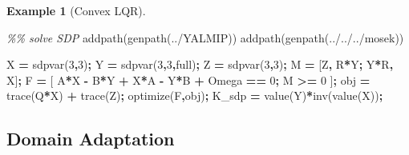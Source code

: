 \documentclass[
]{book}
\newenvironment{Shaded}{\begin{snugshade}}{\end{snugshade}}
\newcommand{\CommentTok}[1]{\textcolor[rgb]{0.56,0.35,0.01}{\textit{#1}}}
\newcommand{\FloatTok}[1]{\textcolor[rgb]{0.00,0.00,0.81}{#1}}
\newcommand{\NormalTok}[1]{#1}
\newcommand{\OperatorTok}[1]{\textcolor[rgb]{0.81,0.36,0.00}{\textbf{#1}}}
\newcommand{\SpecialStringTok}[1]{\textcolor[rgb]{0.31,0.60,0.02}{#1}}
\newcommand{\VariableTok}[1]{\textcolor[rgb]{0.00,0.00,0.00}{#1}}
\theoremstyle{definition}
\theoremstyle{definition}
\newtheorem{example}{Example}[chapter]
\theoremstyle{definition}
\theoremstyle{definition}
\theoremstyle{remark}
\begin{document}
\begin{example}[Convex LQR]
\begin{Shaded}
\begin{Highlighting}[]
\CommentTok{\%\% solve SDP}
\VariableTok{addpath}\NormalTok{(}\VariableTok{genpath}\NormalTok{(}\SpecialStringTok{\textquotesingle{}../YALMIP\textquotesingle{}}\NormalTok{))}
\VariableTok{addpath}\NormalTok{(}\VariableTok{genpath}\NormalTok{(}\SpecialStringTok{\textquotesingle{}../../../mosek\textquotesingle{}}\NormalTok{))}

\VariableTok{X} \OperatorTok{=} \VariableTok{sdpvar}\NormalTok{(}\FloatTok{3}\OperatorTok{,}\FloatTok{3}\NormalTok{)}\OperatorTok{;}
\VariableTok{Y} \OperatorTok{=} \VariableTok{sdpvar}\NormalTok{(}\FloatTok{3}\OperatorTok{,}\FloatTok{3}\OperatorTok{,}\SpecialStringTok{\textquotesingle{}full\textquotesingle{}}\NormalTok{)}\OperatorTok{;}
\VariableTok{Z} \OperatorTok{=} \VariableTok{sdpvar}\NormalTok{(}\FloatTok{3}\OperatorTok{,}\FloatTok{3}\NormalTok{)}\OperatorTok{;}
\VariableTok{M} \OperatorTok{=}\NormalTok{ [}\VariableTok{Z}\OperatorTok{,} \VariableTok{R}\OperatorTok{*}\VariableTok{Y}\OperatorTok{;} \VariableTok{Y}\OperatorTok{\textquotesingle{}*}\VariableTok{R}\OperatorTok{,} \VariableTok{X}\NormalTok{]}\OperatorTok{;}
\VariableTok{F} \OperatorTok{=}\NormalTok{ [}
    \VariableTok{A}\OperatorTok{*}\VariableTok{X} \OperatorTok{{-}} \VariableTok{B}\OperatorTok{*}\VariableTok{Y} \OperatorTok{+} \VariableTok{X}\OperatorTok{*}\VariableTok{A}\OperatorTok{\textquotesingle{}} \OperatorTok{{-}} \VariableTok{Y}\OperatorTok{\textquotesingle{}*}\VariableTok{B}\OperatorTok{\textquotesingle{}} \OperatorTok{+} \VariableTok{Omega} \OperatorTok{==} \FloatTok{0}\OperatorTok{;}
    \VariableTok{M} \OperatorTok{\textgreater{}=} \FloatTok{0}
\NormalTok{]}\OperatorTok{;}
\VariableTok{obj} \OperatorTok{=} \VariableTok{trace}\NormalTok{(}\VariableTok{Q}\OperatorTok{*}\VariableTok{X}\NormalTok{) }\OperatorTok{+} \VariableTok{trace}\NormalTok{(}\VariableTok{Z}\NormalTok{)}\OperatorTok{;}
\VariableTok{optimize}\NormalTok{(}\VariableTok{F}\OperatorTok{,}\VariableTok{obj}\NormalTok{)}\OperatorTok{;}
\VariableTok{K\_sdp} \OperatorTok{=} \VariableTok{value}\NormalTok{(}\VariableTok{Y}\NormalTok{)}\OperatorTok{*}\VariableTok{inv}\NormalTok{(}\VariableTok{value}\NormalTok{(}\VariableTok{X}\NormalTok{))}\OperatorTok{;}
\end{Highlighting}
\end{Shaded}

\end{example}

\subsection{Domain Adaptation}\label{domain-adaptation}
\end{document}
